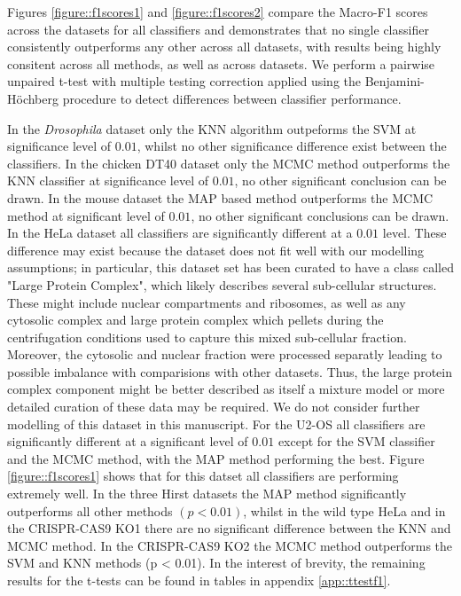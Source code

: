 \documentclass[12pt,english]{article}
\begin{document}
Figures \ref{figure::f1scores1} and \ref{figure::f1scores2} compare the Macro-F1 scores across the datasets for all classifiers
and demonstrates that no single classifier consistently outperforms any other across all datasets, with results being highly consitent across all methods, as well as across datasets. We perform a pairwise unpaired t-test with
multiple testing correction applied using the Benjamini-H\"ochberg procedure \citep{FDR:1995} to detect differences
between classifier performance.

In the \textit{Drosophila} dataset only the KNN algorithm outpeforms the SVM at significance level of $0.01$, whilst no other significance
difference exist between the classifiers. In the chicken DT40 dataset only the MCMC method outperforms the KNN classifier at significance level of $0.01$, no other significant conclusion can be drawn. In the mouse dataset the MAP based method outperforms the MCMC method at significant level of $0.01$, no other significant conclusions can be drawn. In the HeLa dataset all classifiers are significantly different at a $0.01$ level. These difference may exist because the dataset does not fit well with our modelling assumptions; in particular, this dataset set has been curated to have a class called "Large Protein Complex", which likely describes several sub-cellular structures. These might include nuclear compartments and ribosomes, as well as any cytosolic complex and large protein complex which pellets during the centrifugation conditions used to capture
this mixed sub-cellular fraction. Moreover, the cytosolic and nuclear fraction were processed separatly leading to possible imbalance with comparisions with other datasets. Thus, the large protein complex component might be better described as itself a mixture model or more detailed curation of these data may be required. We do not consider further modelling of this dataset in this manuscript. For the U2-OS all classifiers are significantly different at a significant level of $0.01$ except for the SVM classifier and the MCMC method, with the MAP method performing the best. Figure \ref{figure::f1scores1} shows that for this datset all classifiers are performing extremely well. In the three Hirst datasets the MAP method significantly outperforms all other methods $(p < 0.01)$, whilst in the wild type HeLa and in the CRISPR-CAS9 KO1 there are no significant difference between the KNN and MCMC method. In the CRISPR-CAS9 KO2 the MCMC method outperforms the SVM and KNN methods (p < 0.01). In the interest of brevity, the remaining results for the t-tests can be found in tables in appendix \ref{app::ttestf1}.
\end{document}
